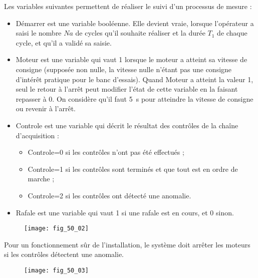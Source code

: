 Les variables suivantes permettent de réaliser le suivi d’un processus de mesure :
\begin{itemize}
\item Démarrer est une variable booléenne. Elle devient vraie, lorsque l’opérateur a saisi
le nombre $Na$ de cycles qu’il souhaite réaliser et la durée $T_1$ de chaque cycle, et
qu’il a validé sa saisie.
\item Moteur est une variable qui vaut 1 lorsque le moteur a atteint sa vitesse de consigne
(supposée non nulle, la vitesse nulle n’étant pas une consigne d’intérêt pratique
pour le banc d’essais). Quand Moteur a atteint la valeur 1, seul le retour à l’arrêt
peut modifier l’état de cette variable en la faisant repasser à 0. On considère qu’il
faut \SI{5}{s} pour atteindre la vitesse de consigne ou revenir à l’arrêt.
\item Controle est une variable qui décrit le résultat des contrôles de la chaîne d’acquisition
:
\begin{itemize}
\item Controle=0 si les contrôles n’ont pas été effectués ;
\item Controle=1 si les contrôles sont terminés et que tout est en ordre de marche ;
\item Controle=2 si les contrôles ont détecté une anomalie.
\end{itemize}
\item Rafale est une variable qui vaut 1 si une rafale est en cours, et 0 sinon.
\end{itemize}
\fi







\ifprof
\else
\fi

\ifprof
\else
\begin{figure}[H]
\centering
\texttt{[image: fig\_50\_02]}
\end{figure}

Pour un fonctionnement sûr de l’installation, le système doit arrêter les moteurs si les
contrôles détectent une anomalie.
\fi


\ifprof
\else
\begin{figure}[H]
\centering
\texttt{[image: fig\_50\_03]}
\end{figure}
\fi




\ifprof
\else


\fi